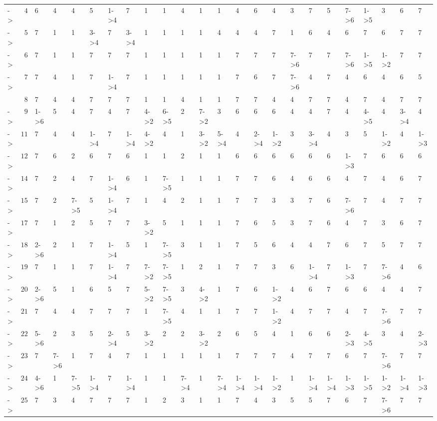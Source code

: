 \documentclass[6pt]{article}
\begin{document}
\begin{landscape}
{\begin{longtable}{lrllllllllllllllllllllll}
-\textgreater &$  4$&6&4&4&5&1-\textgreater 4&7&1&1&4&1&1&4&6&4&3&7&5&7-\textgreater 6&1-\textgreater 5&3&6&7\tabularnewline
-\textgreater &$  5$&7&1&1&3-\textgreater 4&7&3-\textgreater 4&1&1&1&1&4&4&4&7&1&6&4&6&7&6&7&7\tabularnewline
-\textgreater &$  6$&7&1&1&7&7&7&1&1&1&1&1&7&7&7&7-\textgreater 6&7&7&7-\textgreater 6&1-\textgreater 5&1-\textgreater 2&7&7\tabularnewline
-\textgreater &$  7$&7&4&1&7&1-\textgreater 4&7&1&1&1&1&1&7&6&7&7-\textgreater 6&4&7&4&6&4&6&5\tabularnewline
&$  8$&7&4&4&7&7&7&1&1&4&1&1&7&7&4&4&7&7&4&7&4&7&7\tabularnewline
-\textgreater &$  9$&1-\textgreater 6&5&4&7&4&7&4-\textgreater 2&6-\textgreater 5&2&7-\textgreater 2&3&6&6&6&4&4&7&4&4-\textgreater 5&4&3-\textgreater 4&4\tabularnewline
-\textgreater &$ 11$&7&4&4&1-\textgreater 4&7&1-\textgreater 4&4-\textgreater 2&4&1&3-\textgreater 2&5-\textgreater 4&4&2-\textgreater 4&1-\textgreater 2&3&3-\textgreater 4&4&3&5&1-\textgreater 2&4&1-\textgreater 3\tabularnewline
-\textgreater &$ 12$&7&6&2&6&7&6&1&1&2&1&1&6&6&6&6&6&6&1-\textgreater 3&7&6&6&6\tabularnewline
-\textgreater &$ 14$&7&2&4&7&1-\textgreater 4&6&1&7-\textgreater 5&1&1&1&7&7&6&4&6&6&4&7&4&6&7\tabularnewline
-\textgreater &$ 15$&7&2&7-\textgreater 5&5&1-\textgreater 4&7&1&4&2&1&1&7&7&3&3&7&6&7-\textgreater 6&7&4&7&7\tabularnewline
-\textgreater &$ 17$&7&1&2&5&7&7&3-\textgreater 2&5&1&1&1&7&6&5&3&7&6&4&7&3&6&7\tabularnewline
-\textgreater &$ 18$&2-\textgreater 6&2&1&7&1-\textgreater 4&5&1&7-\textgreater 5&3&1&1&7&5&6&4&4&7&6&7&5&7&7\tabularnewline
-\textgreater &$ 19$&7&1&1&7&1-\textgreater 4&7&7-\textgreater 2&7-\textgreater 5&1&2&1&7&7&3&6&1-\textgreater 4&7&1-\textgreater 3&7&7-\textgreater 6&4&6\tabularnewline
-\textgreater &$ 20$&2-\textgreater 6&5&1&6&5&7&5-\textgreater 2&7-\textgreater 5&3&4-\textgreater 2&1&7&6&1-\textgreater 2&4&6&7&6&6&4&4&7\tabularnewline
-\textgreater &$ 21$&7&4&4&7&7&7&1&7-\textgreater 5&4&1&1&7&7&1-\textgreater 2&4&7&7&4&7&7-\textgreater 6&7&7\tabularnewline
-\textgreater &$ 22$&5-\textgreater 6&2&3&5&2-\textgreater 4&5&3-\textgreater 2&2&2&3-\textgreater 2&2&6&5&4&1&6&6&2-\textgreater 3&4-\textgreater 5&3&4&2-\textgreater 3\tabularnewline
-\textgreater &$ 23$&7&7-\textgreater 6&1&7&4&7&1&1&1&1&1&7&7&7&4&7&7&6&7&7-\textgreater 6&7&7\tabularnewline
-\textgreater &$ 24$&4-\textgreater 6&1&7-\textgreater 5&1-\textgreater 4&7&1-\textgreater 4&1&1&7-\textgreater 4&1&7-\textgreater 4&1-\textgreater 4&1-\textgreater 4&1-\textgreater 2&1&1-\textgreater 4&1-\textgreater 4&1-\textgreater 3&1-\textgreater 5&1-\textgreater 2&1-\textgreater 4&1-\textgreater 3\tabularnewline
-\textgreater &$ 25$&7&3&4&7&7&7&1&2&3&1&1&7&4&3&5&5&7&6&7&7-\textgreater 6&7&7\tabularnewline

\end{longtable}}
\end{landscape}
\end{document}
